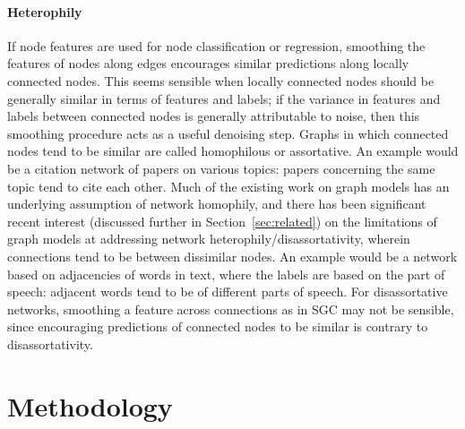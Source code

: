 \documentclass{article}
\begin{document}
\paragraph{Heterophily} If node features are used for node classification or regression, smoothing the features of nodes along edges encourages similar predictions along locally connected nodes. This seems sensible when locally connected nodes should be generally similar in terms of features and labels; if the variance in features and labels between connected nodes is generally attributable to noise, then this smoothing procedure acts as a useful denoising step. Graphs in which connected nodes tend to be similar are called homophilous or assortative. An example would be a citation network of papers on various topics: papers concerning the same topic tend to cite each other. Much of the existing work on graph models has an underlying assumption of network homophily, and there has been significant recent interest (discussed further in Section~\ref{sec:related}) on the limitations of graph models at addressing network heterophily/disassortativity, wherein connections tend to be between dissimilar nodes. An example would be a network based on adjacencies of words in text, where the labels are based on the part of speech: adjacent words tend to be of different parts of speech. For disassortative networks, smoothing a feature across connections as in SGC may not be sensible, since encouraging predictions of connected nodes to be similar is contrary to disassortativity.

\section{Methodology}~\label{sec:method}
%
\end{document}

